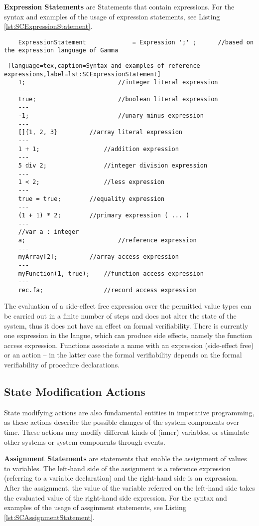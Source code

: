 \textbf{Expression Statements} are Statements that contain expressions. For the syntax and examples of the usage of expression statements, see Listing \ref{lst:SCExpressionStatement}.
\bigskip
\begin{lstlisting}
	ExpressionStatement 			= Expression ';' ;		//based on the expression language of Gamma
\end{lstlisting}
\begin{lstlisting} [language=tex,caption=Syntax and examples of reference expressions,label=lst:SCExpressionStatement]
	1;							//integer literal expression
	---
	true;						//boolean literal expression
	---
	-1;							//unary minus expression
	---
	[]{1, 2, 3}			//array literal expression
	---
	1 + 1;					//addition expression
	---
	5 div 2;				//integer division expression
	---
	1 < 2;					//less expression
	---
	true = true;		//equality expression
	---
	(1 + 1) * 2;		//primary expression ( ... )
	---
	//var a : integer
	a;							//reference expression
	---
	myArray[2];			//array access expression
	---
	myFunction(1, true);	//function access expression
	---
	rec.fa;					//record access expression				
\end{lstlisting}

\bigskip
The evaluation of a side-effect free expression over the permitted value types can be carried out in a finite number of steps and does not alter the state of the system, thus it does not have an effect on formal verifiability. There is currently one expression in the langue, which can produce side effects, namely the function access expression. Functions associate a name with an expression (side-effect free) or an action -- in the latter case the formal verifiability depends on the formal verifiability of procedure declarations.
\subsection{State Modification Actions}
State modifying actions are also fundamental entities in imperative programming, as these actions describe the possible changes of the system components over time. These actions may modify different kinds of (inner) variables, or stimulate other systems or system components through events.

\bigskip
\textbf{Assignment Statements} are statements that enable the assignment of values to variables. The left-hand side of the assignment is a reference expression (referring to a variable declaration) and the right-hand side is an expression. After the assignment, the value of the variable referred on the left-hand side takes the evaluated value of the right-hand side expression. For the syntax and examples of the usage of assginment statements, see Listing \ref{lst:SCAssignmentStatement}.

